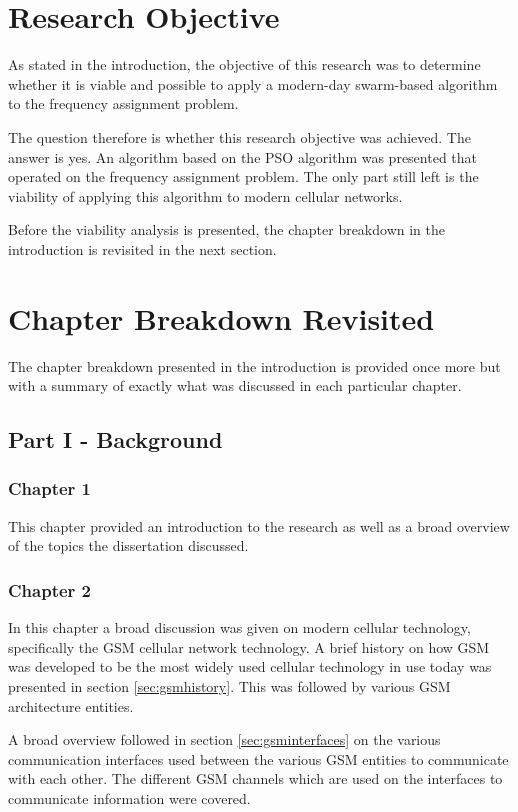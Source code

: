 \section{Research Objective}
As stated in the introduction, the objective of this research was to determine whether it is viable and possible to apply a modern-day swarm-based algorithm to the frequency assignment problem. 

The question therefore is whether this research objective was achieved. The answer is yes. An algorithm based on the PSO algorithm was presented that operated on the frequency assignment problem. The only part still left is the viability of applying this algorithm to modern cellular networks.

Before the viability analysis is presented, the chapter breakdown in the introduction is revisited in the next section.

\section{Chapter Breakdown Revisited}
The chapter breakdown presented in the introduction is provided once more but with a summary of exactly what was discussed in each particular chapter.
\subsection{Part I - Background}
\subsubsection{Chapter 1}
This chapter provided an introduction to the research as well as a broad overview of the topics the dissertation discussed. 
\subsubsection{Chapter 2}
In this chapter a broad discussion was given on modern cellular technology, specifically the GSM cellular network technology. A brief history on how GSM was developed to be the most widely used cellular technology in use today was presented in section \ref{sec:gsmhistory}. This was followed by various GSM architecture entities.

A broad overview followed in section \ref{sec:gsminterfaces} on the various communication interfaces used between the various GSM entities to communicate with each other. The different GSM channels which are used on the interfaces to communicate information were covered.

